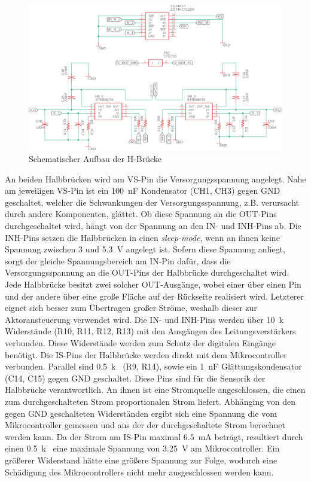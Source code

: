 \begin{figure} [H]
	\centering
	\includegraphics[width=1\linewidth]{Bilder/schematisch_hbruecke.pdf}
	\caption{Schematischer Aufbau der H-Brücke}
	\label{fig:schematisch_hbruecke}
\end{figure}\noindent
An beiden Halbbrücken wird am VS-Pin die Versorgungsspannung angelegt. Nahe am jeweiligen VS-Pin ist ein \SI{100}{nF} Kondensator (CH1, CH3) gegen GND geschaltet, welcher die Schwankungen der Versorgungsspannung, z.B. verursacht durch andere Komponenten, glättet. Ob diese Spannung an die OUT-Pins durchgeschaltet wird, hängt von der Spannung an den IN- und INH-Pins ab. Die INH-Pins setzen die Halbbrücken in einen \textit{sleep-mode}, wenn an ihnen keine Spannung zwischen 3 und \SI{5,3}{V} angelegt ist. Sofern diese Spannung anliegt, sorgt der gleiche Spannungsbereich am IN-Pin dafür, dass die Versorgungsspannung an die OUT-Pins der Halbbrücke durchgeschaltet wird. Jede Halbbrücke besitzt zwei solcher OUT-Ausgänge, wobei einer über einen Pin und der andere über eine große Fläche auf der Rückseite realisiert wird. Letzterer eignet sich besser zum Übertragen großer Ströme, weshalb dieser zur Aktoransteuerung verwendet wird.  Die IN- und INH-Pins werden über \SI{10}{k\Omega} Widerstände (R10, R11, R12, R13) mit den Ausgängen des Leitungsverstärkers verbunden. Diese Widerstände werden zum Schutz der digitalen Eingänge benötigt.
Die IS-Pins der Halbbrücke werden direkt mit dem Mikrocontroller verbunden. Parallel sind \SI{0,5}{k\Omega} (R9, R14), sowie ein  \SI{1}{nF} Glättungskondensator (C14, C15) gegen GND geschaltet. Diese Pins sind für die Sensorik der Halbbrücke verantwortlich. An ihnen ist eine Stromquelle angeschlossen, die einen zum durchgeschalteten Strom proportionalen Strom liefert. Abhänging von den gegen GND geschalteten Widerständen ergibt sich eine Spannung die vom Mikrocontroller gemessen und aus der der durchgeschaltete Strom berechnet werden kann. Da der Strom am IS-Pin maximal \SI{6,5}{mA} beträgt, resultiert durch einen \SI{0,5}{k\Omega} eine maximale Spannung von \SI{3,25}{V} am Mikrocontroller. Ein größerer Widerstand hätte eine größere Spannung zur Folge, wodurch eine Schädigung des Mikrocontrollers nicht mehr ausgeschlossen werden kann. 

